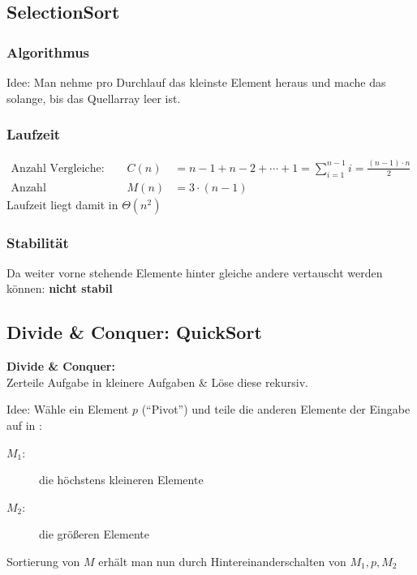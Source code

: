 \documentclass{scrartcl}
\begin{document}
\subsection{SelectionSort}
\subsubsection{Algorithmus}
Idee: Man nehme pro Durchlauf das kleinste Element heraus und mache das solange, bis das Quellarray leer ist.

\subsubsection{Laufzeit}
\begin{align*}
\textrm{Anzahl Vergleiche:} & & C(n) &= n-1 + n-2 + \cdots + 1 = \sum^{n-1}_{i=1}i = \frac{(n-1)\cdot n}{2} \\
\textrm{Anzahl Umspeicherungen:} & & M(n) &= 3\cdot (n-1)
\end{align*}
Laufzeit liegt damit in $\Theta(n^2)$
\subsubsection{Stabilität}
Da weiter vorne stehende Elemente hinter gleiche andere vertauscht werden können: \textbf{nicht stabil}

\subsection{Divide \& Conquer: QuickSort}
\begin{shaded}
\textbf{Divide \& Conquer:} \\ Zerteile Aufgabe in kleinere Aufgaben \& Löse diese rekursiv.
\end{shaded}

Idee: Wähle ein Element $p$ ("`Pivot"') und teile die anderen Elemente der Eingabe auf in :
\begin{description}
	\item[$M_1$:] die höchstens kleineren Elemente
	\item[$M_2$:] die größeren Elemente
\end{description}
Sortierung von $M$ erhält man nun durch Hintereinanderschalten von $M_1,p,M_2$
\end{document}
